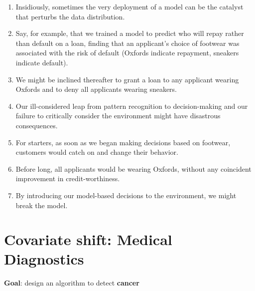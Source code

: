 \begin{enumerate}
    \item Insidiously, sometimes the very deployment of a model can be the catalyst that perturbs the data distribution.

    \item Say, for example, that we trained a model to predict who will repay rather than default on a loan, finding that an applicant’s choice of footwear was associated with the risk of default (Oxfords indicate repayment, sneakers indicate default).
    
    \item We might be inclined thereafter to grant a loan to any applicant wearing Oxfords and to deny all applicants wearing sneakers.
    
    \item Our ill-considered leap from pattern recognition to decision-making and our failure to critically consider the environment might have disastrous consequences. 
    
    \item For starters, as soon as we began making decisions based on footwear, customers would catch on and change their behavior. 
    
    \item Before long, all applicants would be wearing Oxfords, without any coincident improvement in credit-worthiness. 
    
    \item By introducing our model-based decisions to the environment, we might break the model.
\end{enumerate}


\section{Covariate shift: Medical Diagnostics \cite{dnn-1}} \label{Story: Covariate shift: Medical Diagnostics}

\textbf{Goal}: design an algorithm to detect \textbf{cancer}

